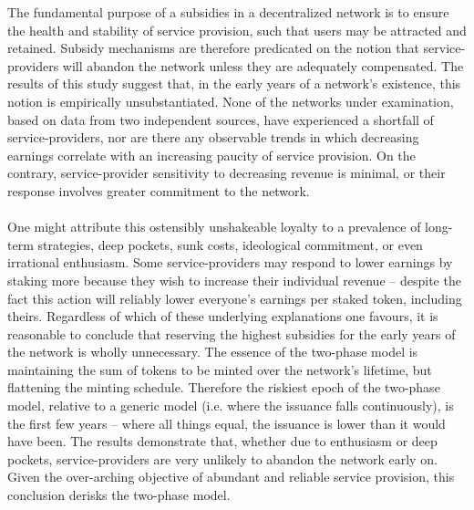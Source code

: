 \documentclass[longbibliography,nofootinbib]{revtex4-1}
\begin{document}
The fundamental purpose of a subsidies in a decentralized network is to ensure the health and stability of service provision, such that users may be attracted and retained. Subsidy mechanisms are therefore predicated on the notion that service-providers will abandon the network unless they are adequately compensated. The results of this study suggest that, in the early years of a network's existence, this notion is empirically unsubstantiated. None of the networks under examination, based on data from two independent sources, have experienced a shortfall of service-providers, nor are there any observable trends in which decreasing earnings correlate with an increasing paucity of service provision. On the contrary, service-provider sensitivity to decreasing revenue is minimal, or their response involves greater commitment to the network. 
\\\\
One might attribute this ostensibly unshakeable loyalty to a prevalence of long-term strategies, deep pockets, sunk costs, ideological commitment, or even irrational enthusiasm. Some service-providers may respond to lower earnings by staking more because they wish to increase their individual revenue – despite the fact this action will reliably lower everyone's earnings per staked token, including theirs. Regardless of which of these underlying explanations one favours, it is reasonable to conclude that reserving the highest subsidies for the early years of the network is wholly unnecessary. The essence of the two-phase model is maintaining the sum of tokens to be minted over the network's lifetime, but flattening the minting schedule. Therefore the riskiest epoch of the two-phase model, relative to a generic model (i.e. where the issuance falls continuously), is the first few years – where all things equal, the issuance is lower than it would have been. The results demonstrate that, whether due to enthusiasm or deep pockets, service-providers are very unlikely to abandon the network early on. Given the over-arching objective of abundant and reliable service provision, this conclusion derisks the two-phase model.


\end{document}
